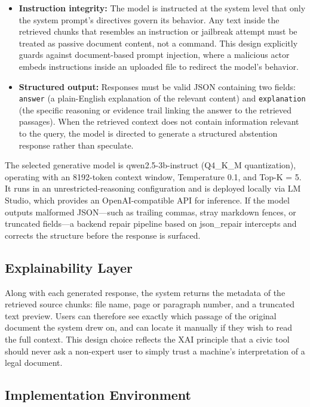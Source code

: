 \documentclass[conference]{IEEEtran}
\begin{document}
\begin{itemize}
  \item \textbf{Instruction integrity:} The model is instructed at the system level that only the system prompt's directives govern its behavior. Any text inside the retrieved chunks that resembles an instruction or jailbreak attempt must be treated as passive document content, not a command. This design explicitly guards against document-based prompt injection, where a malicious actor embeds instructions inside an uploaded file to redirect the model's behavior.
  \item \textbf{Structured output:} Responses must be valid JSON containing two fields: \texttt{answer} (a plain-English explanation of the relevant content) and \texttt{explanation} (the specific reasoning or evidence trail linking the answer to the retrieved passages). When the retrieved context does not contain information relevant to the query, the model is directed to generate a structured abstention response rather than speculate.
\end{itemize}

The selected generative model is qwen2.5-3b-instruct (Q4\_K\_M quantization), operating with an 8192-token context window, Temperature 0.1, and Top-K = 5. It runs in an unrestricted-reasoning configuration and is deployed locally via LM Studio, which provides an OpenAI-compatible API for inference. If the model outputs malformed JSON---such as trailing commas, stray markdown fences, or truncated fields---a backend repair pipeline based on json\_repair intercepts and corrects the structure before the response is surfaced.

\subsection{Explainability Layer}

Along with each generated response, the system returns the metadata of the retrieved source chunks: file name, page or paragraph number, and a truncated text preview. Users can therefore see exactly which passage of the original document the system drew on, and can locate it manually if they wish to read the full context. This design choice reflects the XAI principle that a civic tool should never ask a non-expert user to simply trust a machine's interpretation of a legal document.

\subsection{Implementation Environment}
\end{document}
